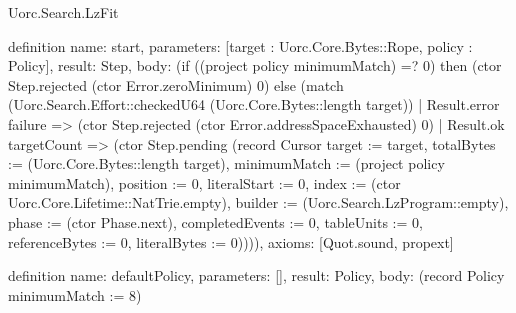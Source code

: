 \begin{lexlean}{Uorc.Search.LzFit}
\begin{semanticmodule}
definition{
  name: start,
  parameters: [target : Uorc.Core.Bytes::Rope, policy : Policy],
  result: Step,
  body: (if ((project policy minimumMatch) =? 0) then (ctor Step.rejected (ctor Error.zeroMinimum) 0) else (match (Uorc.Search.Effort::checkedU64 (Uorc.Core.Bytes::length target))
    | Result.error failure => (ctor Step.rejected (ctor Error.addressSpaceExhausted) 0)
    | Result.ok targetCount => (ctor Step.pending (record Cursor {target := target, totalBytes := (Uorc.Core.Bytes::length target), minimumMatch := (project policy minimumMatch), position := 0, literalStart := 0, index := (ctor Uorc.Core.Lifetime::NatTrie.empty), builder := (Uorc.Search.LzProgram::empty), phase := (ctor Phase.next), completedEvents := 0, tableUnits := 0, referenceBytes := 0, literalBytes := 0})))),
  axioms: [Quot.sound, propext]
}

definition{
  name: defaultPolicy,
  parameters: [],
  result: Policy,
  body: (record Policy {minimumMatch := 8})
}


\end{semanticmodule}
\end{lexlean}
